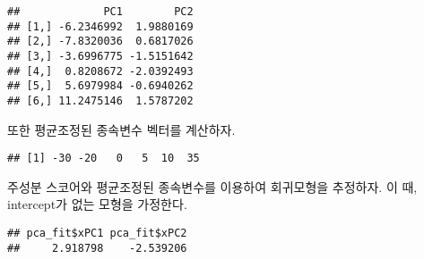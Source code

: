 \documentclass[]{book}
\newenvironment{Shaded}{\begin{snugshade}}{\end{snugshade}}
\newcommand{\DataTypeTok}[1]{\textcolor[rgb]{0.13,0.29,0.53}{#1}}
\newcommand{\DecValTok}[1]{\textcolor[rgb]{0.00,0.00,0.81}{#1}}
\newcommand{\KeywordTok}[1]{\textcolor[rgb]{0.13,0.29,0.53}{\textbf{#1}}}
\newcommand{\NormalTok}[1]{#1}
\newcommand{\OperatorTok}[1]{\textcolor[rgb]{0.81,0.36,0.00}{\textbf{#1}}}
\newcommand{\OtherTok}[1]{\textcolor[rgb]{0.56,0.35,0.01}{#1}}
\newcommand{\StringTok}[1]{\textcolor[rgb]{0.31,0.60,0.02}{#1}}
\begin{document}
\begin{Shaded}
\end{Shaded}

\begin{verbatim}
##             PC1        PC2
## [1,] -6.2346992  1.9880169
## [2,] -7.8320036  0.6817026
## [3,] -3.6996775 -1.5151642
## [4,]  0.8208672 -2.0392493
## [5,]  5.6979984 -0.6940262
## [6,] 11.2475146  1.5787202
\end{verbatim}

또한 평균조정된 종속변수 벡터를 계산하자.

\begin{Shaded}
\end{Shaded}

\begin{verbatim}
## [1] -30 -20   0   5  10  35
\end{verbatim}

주성분 스코어와 평균조정된 종속변수를 이용하여 회귀모형을 추정하자. 이 때, intercept가 없는 모형을 가정한다.

\begin{Shaded}
\end{Shaded}

\begin{verbatim}
## pca_fit$xPC1 pca_fit$xPC2 
##     2.918798    -2.539206
\end{verbatim}
\end{document}
